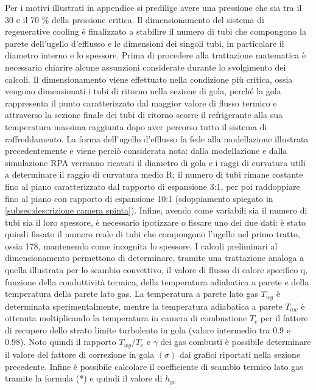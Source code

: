 Per i motivi illustrati in appendice si predilige avere una pressione che sia tra il 30 e il 70 \% della pressione critica.
Il dimensionamento del sistema di regenerative cooling è finalizzato a stabilire il numero di tubi che compongono la parete dell'ugello d'efflusso e le dimensioni dei singoli tubi, in particolare il diametro interno e lo spessore. Prima di procedere alla trattazione matematica è necessario chiarire alcune assunzioni considerate durante lo svolgimento dei calcoli. Il dimensionamento viene effettuato nella condizione più critica, ossia vengono dimensionati i tubi di ritorno nella sezione di gola, perché la gola rappresenta il punto caratterizzato dal maggior valore di flusso termico e attraverso la sezione finale dei tubi di ritorno scorre il refrigerante alla sua temperatura massima raggiunta dopo aver percorso tutto il sistema di raffreddamento. La forma dell'ugello d'efflusso fa fede alla modellazione illustrata precedentemente e viene perciò considerata nota: dalla modellazione e dalla simulazione RPA verranno ricavati il diametro di gola e i raggi di curvatura utili a determinare il raggio di curvatura medio R; il numero di tubi rimane costante fino al piano caratterizzato dal rapporto di espansione 3:1, per poi raddoppiare fino al piano con rapporto di espansione 10:1 (sdoppiamento spiegato in \autoref{subsec:descrizione camera spinta}). Infine, avendo come variabili sia il numero di tubi sia il loro spessore, è necessario ipotizzare o fissare uno dei due dati: è stato quindi fissato il numero reale di tubi che compongono l'ugello nel primo tratto, ossia 178, mantenendo come incognita lo spessore.
I calcoli preliminari al dimensionamento permettono di determinare, tramite una trattazione analoga a quella illustrata per lo scambio convettivo, il valore di flusso di calore specifico q, funzione della conduttività termica, della temperatura adiabatica a parete e della temperatura della parete lato gas. 
La temperatura a parete lato gas $T_{wg}$ è determinata sperimentalmente, mentre la temperatura adiabatica a parete $T_{aw}$ è ottenuta moltiplicando la temperatura in camera di combustione $T_c$ per il fattore di recupero dello strato limite turbolento in gola (valore intermedio tra 0.9 e 0.98). Noto quindi il rapporto $T_{wg}/T_c$ e $\gamma$ dei gas combusti è possibile determinare il valore del fattore di correzione in gola $\left( \sigma \right)$ dai grafici riportati nella sezione precedente. Infine è possibile calcolare il coefficiente di scambio termico lato gas tramite la formula (*)
e quindi il valore di $h_{gc}$

